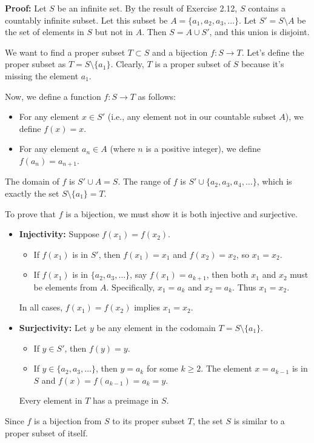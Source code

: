 \textbf{Proof:}  
Let $S$ be an infinite set. By the result of Exercise 2.12, $S$ contains a countably infinite subset. Let this subset be $A = \{a_1, a_2, a_3, \dots \}$.
Let $S' = S \setminus A$ be the set of elements in $S$ but not in $A$. Then $S = A \cup S'$, and this union is disjoint.

We want to find a proper subset $T \subset S$ and a bijection $f: S \to T$.
Let's define the proper subset as $T = S \setminus \{a_1\}$. Clearly, $T$ is a proper subset of $S$ because it's missing the element $a_1$.

Now, we define a function $f: S \to T$ as follows:
\begin{itemize}
\item For any element $x \in S'$ (i.e., any element not in our countable subset $A$), we define $f(x) = x$.
\item For any element $a_n \in A$ (where $n$ is a positive integer), we define $f(a_n) = a_{n+1}$.
\end{itemize}
The domain of $f$ is $S' \cup A = S$. The range of $f$ is $S' \cup \{a_2, a_3, a_4, \dots\}$, which is exactly the set $S \setminus \{a_1\} = T$.

To prove that $f$ is a bijection, we must show it is both injective and surjective.
\begin{itemize}
\item \textbf{Injectivity:} Suppose $f(x_1) = f(x_2)$.
\begin{itemize}
\item If $f(x_1)$ is in $S'$, then $f(x_1)=x_1$ and $f(x_2)=x_2$, so $x_1=x_2$.
\item If $f(x_1)$ is in $\{a_2, a_3, \dots\}$, say $f(x_1) = a_{k+1}$, then both $x_1$ and $x_2$ must be elements from $A$. Specifically, $x_1 = a_k$ and $x_2 = a_k$. Thus $x_1=x_2$.
\end{itemize}
In all cases, $f(x_1)=f(x_2)$ implies $x_1=x_2$.
\item \textbf{Surjectivity:} Let $y$ be any element in the codomain $T = S \setminus \{a_1\}$.
\begin{itemize}
\item If $y \in S'$, then $f(y) = y$.
\item If $y \in \{a_2, a_3, \dots\}$, then $y=a_k$ for some $k \geq 2$. The element $x=a_{k-1}$ is in $S$ and $f(x) = f(a_{k-1}) = a_k = y$.
\end{itemize}
Every element in $T$ has a preimage in $S$.
\end{itemize}
Since $f$ is a bijection from $S$ to its proper subset $T$, the set $S$ is similar to a proper subset of itself.


